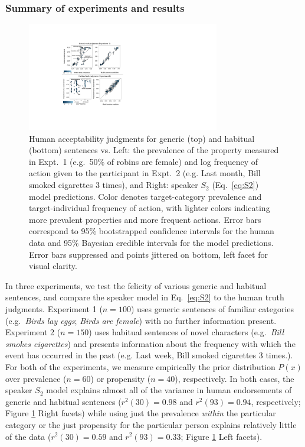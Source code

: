 \documentclass[11pt,letterpaper]{article}
\begin{document}
\subsubsection*{Summary of experiments and results}

\begin{figure}[t]
\centering
  \includegraphics[width=0.75\textwidth]{tj-2x2}
  \caption{Human acceptability judgments for generic (top) and habitual (bottom) sentences vs. Left: the prevalence of the property measured in Expt.~1 (e.g.~50\% of robins are female) and log frequency of action given to the participant in Expt.~2 (e.g. Last month, Bill smoked cigarettes 3 times), and 
  Right: speaker $S_2$ (Eq.~\ref{eq:S2}) model predictions.
  Color denotes target-category prevalence and target-individual frequency of action, with lighter colors indicating more prevalent properties and more frequent actions. 
  Error bars correspond to 95\% bootstrapped confidence intervals for the human data and 95\% Bayesian credible intervals for the model predictions. 
  Error bars suppressed and points jittered on bottom, left facet for visual clarity.}
  \label{fig:tj}
\end{figure}


In three experiments, we test the felicity of various generic and habitual sentences, and compare the speaker model in Eq.~\ref{eq:S2} to the human truth judgments. 
Experiment 1 ($n=100$) uses generic sentences of familiar categories (e.g.~\emph{Birds lay eggs}; \emph{Birds are female}) with no further information present.
Experiment 2 ($n=150$) uses habitual sentences of novel characters (e.g.~\emph{Bill smokes cigarettes}) and presents information about the frequency with which the event has occurred in the past (e.g. Last week, Bill smoked cigarettes 3 times.). 
For both of the experiments, we measure empirically the prior distribution $P(x)$ over prevalence ($n=60$) or propensity ($n=40$), respectively.
In both cases, the speaker $S_2$ model explains almost all of the variance in human endorsements of generic and habitual sentences ($r^2(30) = 0.98$ and $r^2(93) = 0.94$, respectively; Figure \ref{fig:tj} Right facets) while using just the prevalence \emph{within} the particular category or the just propensity for the particular person explains relatively little of the data ($r^2(30) = 0.59$ and $r^2(93) = 0.33$; Figure \ref{fig:tj} Left facets).
\end{document}
